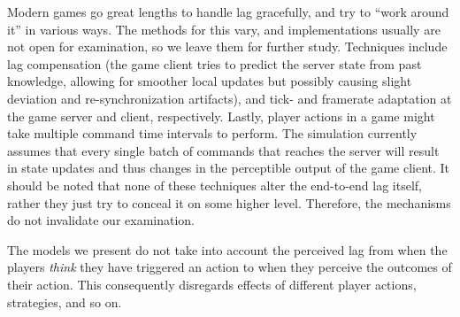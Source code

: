 Modern games go great lengths to handle lag gracefully, and try to ``work around it'' in various ways. The methods for this vary, and implementations usually are not open for examination, so we leave them for further study. Techniques include lag compensation (the game client tries to predict the server state from past knowledge, allowing for smoother local updates but possibly causing slight deviation and re-synchronization artifacts), and tick- and framerate adaptation at the game server and client, respectively. Lastly, player actions in a game might take multiple command time intervals to perform. The simulation currently assumes that every single batch of commands that reaches the server will result in state updates and thus changes in the perceptible output of the game client. It should be noted that none of these techniques alter the end-to-end lag itself, rather they just try to conceal it on some higher level. Therefore, the mechanisms do not invalidate our examination.

The models we present do not take into account the perceived lag from when the players \textit{think} they have triggered an action to when they perceive the outcomes of their action. This consequently disregards effects of different player actions, strategies, and so on.















